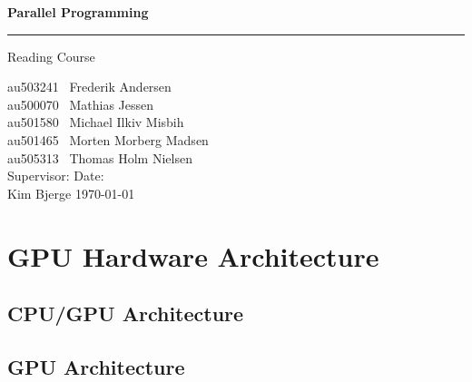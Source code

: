 \documentclass[12px,oz]{report}
\begin{document}
	
	\begin{titlepage}
		\centering
		\vspace*{3\baselineskip}
		{\Huge \bfseries Parallel Programming}
		\rule{\linewidth}{0.5mm}
		\LARGE
		Reading Course
		\\
		\null\vfill
		\begin{flushleft} \large
			au503241 \hspace*{2em} \  Frederik Andersen\\
			au500070 \hspace*{2em} \  Mathias Jessen\\
			au501580 \hspace*{2em} \  Michael Ilkiv Misbih\\
			au501465 \hspace*{2em} \  Morten Morberg Madsen\\
			au505313 \hspace*{2em} \  Thomas Holm Nielsen\\
			\vspace{100pt}
			Supervisor:\hspace{94pt}  Date: \\
			Kim Bjerge \hspace{90pt}  \today\\
		\end{flushleft}
		\vspace*{6\baselineskip}
	\end{titlepage}

\tableofcontents
\clearpage
{}
\cleardoublepage

\chapter{GPU Hardware Architecture}
\label{ch-hw-gpu-hardware-architecture}


	\section{CPU/GPU Architecture}
	\label{sec-hw-cpu-gpu-architecture}
	

	\section{GPU Architecture}
	\label{sec-hw-gpu-architecture}
	
\end{document}
